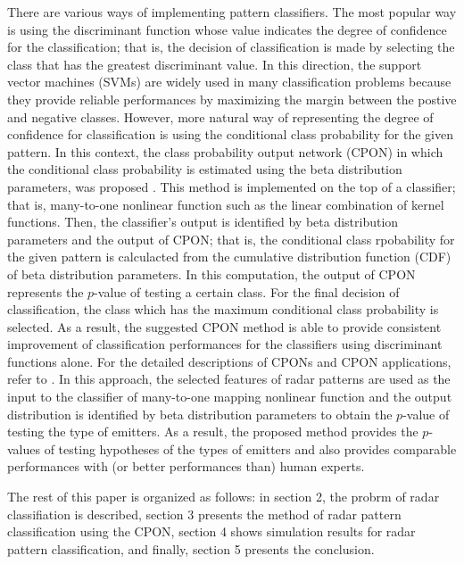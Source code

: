 \documentclass[runningheads,a4paper]{llncs}
\begin{document}
There are various ways of implementing pattern classifiers. The most popular way is using the discriminant function whose value
indicates the degree of confidence for the classification; that is, the decision of classification is made by selecting the class that
has the greatest discriminant value. In this direction, the support vector machines (SVMs) \cite{cit:Vp} are widely used in many
classification problems because they provide reliable performances by maximizing the margin between the postive and negative classes.
However, more natural way of representing the degree of confidence for classification is using the conditional class probability for
the given pattern. In this context, the class probability output network (CPON) in which
the conditional class probability is estimated using the beta distribution parameters, was proposed \cite{cit:PK}.  This method is implemented on the top of
a classifier; that is, many-to-one nonlinear function such as the linear combination of kernel functions. Then, the classifier's output
is identified by beta distribution parameters and the output of CPON; that is, the conditional class rpobability for the given pattern
is calculacted from the cumulative distribution function (CDF) of beta distribution parameters. 
In this computation, the output of CPON represents the $p$-value of testing a certain class. For the final decision of classification,
the class which has the maximum conditional class probability is selected.
As a result, the suggested CPON method is able to provide consistent improvement of classification
performances for the classifiers using discriminant functions alone. For the detailed descriptions of CPONs and CPON applications,
refer to \cite{cit:PK,cit:HKH}. In this approach, the selected features of radar patterns are used as the input to the classifier of many-to-one mapping nonlinear
function and the output distribution is identified by beta distribution parameters to obtain the $p$-value of testing the type of emitters.
As a result, the proposed method provides the $p$-values of testing hypotheses of the types of emitters and
also provides comparable performances with (or better performances than) human experts.

The rest of this paper is organized as follows: in section 2, the probrm of radar classifiation is described, section 3 presents
the method of radar pattern classification using the CPON, section 4 shows simulation results for radar pattern classification, and finally, section 5 presents the conclusion.
\end{document}
